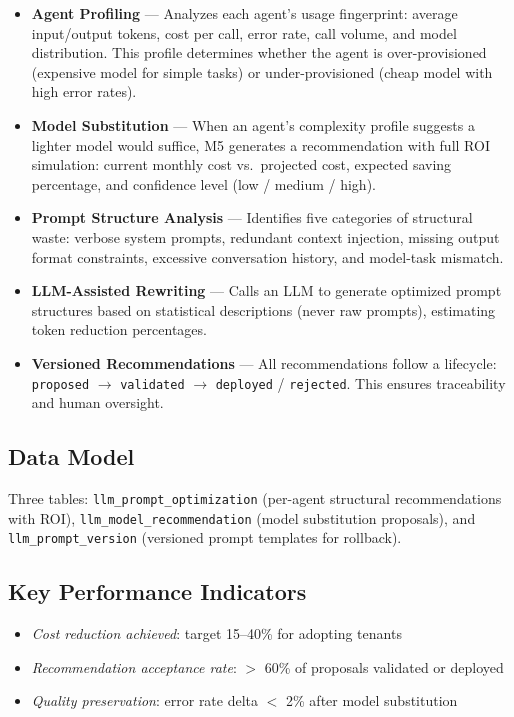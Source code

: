 \documentclass[12pt,a4paper,twoside]{report}
\newcommand{\kpi}[1]{\textit{\textcolor{accentgreen}{#1}}}
\begin{document}
\begin{itemize}
  \item \textbf{Agent Profiling} — Analyzes each agent's usage fingerprint: average input/output tokens, cost per call, error rate, call volume, and model distribution. This profile determines whether the agent is over-provisioned (expensive model for simple tasks) or under-provisioned (cheap model with high error rates).

  \item \textbf{Model Substitution} — When an agent's complexity profile suggests a lighter model would suffice, M5 generates a recommendation with full ROI simulation: current monthly cost vs.\ projected cost, expected saving percentage, and confidence level (low / medium / high).

  \item \textbf{Prompt Structure Analysis} — Identifies five categories of structural waste: verbose system prompts, redundant context injection, missing output format constraints, excessive conversation history, and model-task mismatch.

  \item \textbf{LLM-Assisted Rewriting} — Calls an LLM to generate optimized prompt structures based on statistical descriptions (never raw prompts), estimating token reduction percentages.

  \item \textbf{Versioned Recommendations} — All recommendations follow a lifecycle: \texttt{proposed} $\rightarrow$ \texttt{validated} $\rightarrow$ \texttt{deployed} / \texttt{rejected}. This ensures traceability and human oversight.
\end{itemize}

\subsection{Data Model}
Three tables: \texttt{llm\_prompt\_optimization} (per-agent structural recommendations with ROI), \texttt{llm\_model\_recommendation} (model substitution proposals), and \texttt{llm\_prompt\_version} (versioned prompt templates for rollback).

\subsection{Key Performance Indicators}
\begin{itemize}
  \item \kpi{Cost reduction achieved}: target 15--40\% for adopting tenants
  \item \kpi{Recommendation acceptance rate}: $>$ 60\% of proposals validated or deployed
  \item \kpi{Quality preservation}: error rate delta $<$ 2\% after model substitution
\end{itemize}
\end{document}
